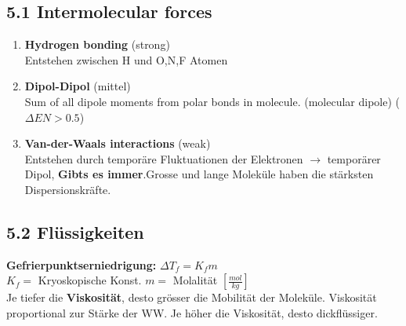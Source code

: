 \subsection{5.1 Intermolecular forces}
    \begin{enumerate}
        \item \textbf{Hydrogen bonding} (strong)\\
            Entstehen zwischen H und O,N,F Atomen
        \item \textbf{Dipol-Dipol} (mittel) \\
            Sum of all dipole moments from polar bonds in molecule. (molecular dipole) ($\Delta EN>0.5$)
        \item \textbf{Van-der-Waals interactions} (weak)\\
            Entstehen durch temporäre Fluktuationen der Elektronen $\rightarrow$ temporärer Dipol,
            \textbf{Gibts es immer}.Grosse und lange Moleküle haben die stärksten Dispersionskräfte.
    \end{enumerate}

\subsection{5.2 Flüssigkeiten}
    \textbf{Gefrierpunktserniedrigung: } $\Delta T_f=K_fm$\\
    $K_f=$ Kryoskopische Konst.     $m=$ Molalität $\left[\frac{mol}{kg}\right]$\\
    Je tiefer die \textbf{Viskosität}, desto grösser die Mobilität der Moleküle. Viskosität proportional
    zur Stärke der WW. Je höher die Viskosität, desto dickflüssiger. 

